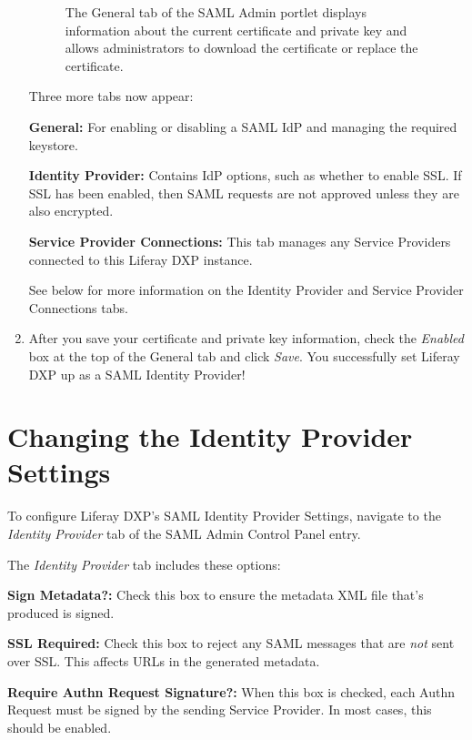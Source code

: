 \begin{enumerate}
  \begin{figure}
  \centering
  \caption{The General tab of the SAML Admin portlet displays
  information about the current certificate and private key and allows
  administrators to download the certificate or replace the
  certificate.}
  \end{figure}

  Three more tabs now appear:

  \textbf{General:} For enabling or disabling a SAML IdP and managing
  the required keystore.

  \textbf{Identity Provider:} Contains IdP options, such as whether to
  enable SSL. If SSL has been enabled, then SAML requests are not
  approved unless they are also encrypted.

  \textbf{Service Provider Connections:} This tab manages any Service
  Providers connected to this Liferay DXP instance.

  See below for more information on the Identity Provider and Service
  Provider Connections tabs.
\item
  After you save your certificate and private key information, check the
  \emph{Enabled} box at the top of the General tab and click
  \emph{Save}. You successfully set Liferay DXP up as a SAML Identity
  Provider!
\end{enumerate}

\section{Changing the Identity Provider
Settings}\label{changing-the-identity-provider-settings}

To configure Liferay DXP's SAML Identity Provider Settings, navigate to
the \emph{Identity Provider} tab of the SAML Admin Control Panel entry.

The \emph{Identity Provider} tab includes these options:

\textbf{Sign Metadata?:} Check this box to ensure the metadata XML file
that's produced is signed.

\textbf{SSL Required:} Check this box to reject any SAML messages that
are \emph{not} sent over SSL. This affects URLs in the generated
metadata.

\textbf{Require Authn Request Signature?:} When this box is checked,
each Authn Request must be signed by the sending Service Provider. In
most cases, this should be enabled.

